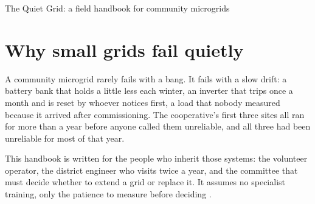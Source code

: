 
\RKFrontMatterBegin
{}

\begin{bookdetails}{The Quiet Grid: a field handbook for community microgrids}
\end{bookdetails}

\RKContents
\RKMainMatterBegin


\section{Why small grids fail quietly}
\label{ch:quiet-failure}

A community microgrid rarely fails with a bang. It fails with a slow drift: a battery
bank that holds a little less each winter, an inverter that trips once a month and is
reset by whoever notices first, a load that nobody measured because it arrived after
commissioning. The cooperative's first three sites all ran for more than a year before
anyone called them unreliable, and all three had been unreliable for most of that year.

This handbook is written for the people who inherit those systems: the volunteer
operator, the district engineer who visits twice a year, and the committee that must
decide whether to extend a grid or replace it. It assumes no specialist training, only
the patience to measure before deciding \cite{valley-survey}.

